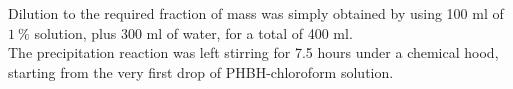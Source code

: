 \documentclass{article}
\begin{document}




%


%

        Dilution to the required fraction of mass was simply obtained by using 100 ml of $1 \ \%$ solution, 
        plus 300 ml of water, for a total of 400 ml. \\ 

        The precipitation reaction was left stirring for 7.5 hours under a 
        chemical hood, starting from the very first drop of PHBH-chloroform solution. 
\end{document}
